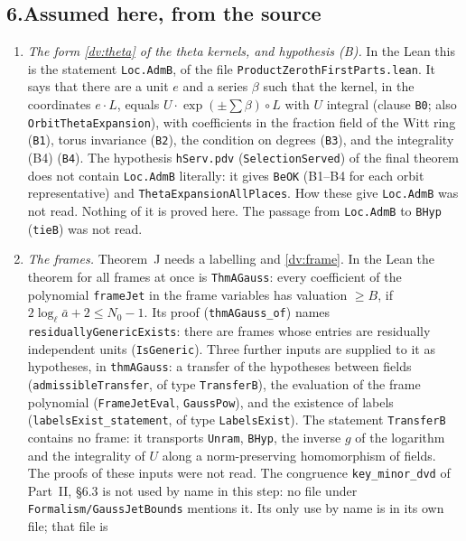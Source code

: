 \documentclass[11pt,letterpaper]{article}
\begin{document}
\subsection*{6.\quad Assumed here, from the source}

\begin{enumerate}[label=\textup{(\roman*)},leftmargin=2.4em]
\item \emph{The form \eqref{dv:theta} of the theta kernels, and hypothesis \textup{(B)}.} In the Lean this is
the statement \texttt{Loc.AdmB}, of the file \texttt{ProductZerothFirstParts.lean}. It says that there are a unit $e$ and a series $\beta$ such
that the kernel, in the coordinates $e\cdot L$, equals $U\cdot\exp(\pm\sum\beta)\circ L$ with $U$ integral
(clause \texttt{B0}; also \texttt{OrbitThetaExpansion}), with coefficients in the fraction field of the
Witt ring (\texttt{B1}), torus invariance (\texttt{B2}), the condition on degrees (\texttt{B3}), and the
integrality (B4) (\texttt{B4}). The hypothesis \texttt{hServ.pdv} (\texttt{SelectionServed}) of the final theorem does not contain
\texttt{Loc.AdmB} literally: it gives \texttt{BeOK} (B1--B4 for each orbit representative) and
\texttt{ThetaExpansionAllPlaces}. How these give \texttt{Loc.AdmB} was not read. Nothing of it is proved
here. The passage from
\texttt{Loc.AdmB} to \texttt{BHyp} (\texttt{tieB}) was not read.
\item \emph{The frames.} Theorem~J needs a labelling and \eqref{dv:frame}. In the Lean the theorem for all
frames at once is \texttt{ThmAGauss}: every coefficient of the polynomial \texttt{frameJet} in the frame
variables has valuation $\ge B$, if $2\log_\ell\bar a+2\le N_0-1$. Its proof (\texttt{thmAGauss\_of}) names
\texttt{residuallyGenericExists}: there are frames whose entries are residually independent units
(\texttt{IsGeneric}). Three further inputs are supplied to it as hypotheses, in \texttt{thmAGauss}: a transfer
of the hypotheses between fields (\texttt{admissibleTransfer}, of type \texttt{TransferB}), the evaluation
of the frame polynomial (\texttt{FrameJetEval}, \texttt{GaussPow}), and the existence of labels
(\texttt{labelsExist\_statement}, of type \texttt{LabelsExist}). The statement \texttt{TransferB} contains no
frame: it transports \texttt{Unram}, \texttt{BHyp}, the inverse $g$ of the logarithm and the integrality of
$U$ along a norm-preserving homomorphism of fields. The proofs of these inputs were not read. The congruence
\texttt{key\_minor\_dvd} of Part~II, \S6.3 is not used by name in this step: no file under
\texttt{Formalism/GaussJetBounds} mentions it. Its only use by name is in its own file; that file is

\end{enumerate}
\end{document}
